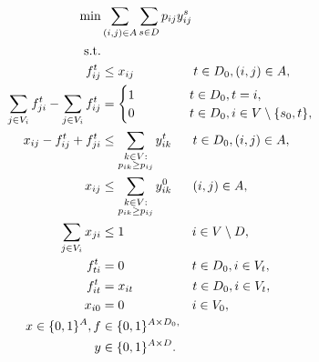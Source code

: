     \begin{subequations}
    \begin{flalign}
  \min &  \sum\limits_{(i,j) \in A} \sum\limits_{s \in D} p_{ij} y^s_{ij}    \\  \notag  
		   \text{s.t.}&                  && \\	\ 
\label{con:pf1:xfrel}  f^{t}_{ij}   &\leq x_{ij}    ~~ \qquad \qquad t\in D_0, (i,j)\in A, \\
 \label{con:pf1:flow}  \sum\limits_{\substack{ j \in V_i }}f^{t}_{ji}-\sum\limits_{\substack{j\in V_i}}f^{t}_{ij}    & = \begin{cases}
    1~~~~&  t\in D_0, t = i, \\        0~~~~ \qquad             & t\in D_0, i\in V\setminus \{s_0, t\},\end{cases}     \\	
\label{con:pf1:yvar} x_{ij} -f^t_{ij}+f^t_{ji}  &\leq \sum\limits_{\substack{k\in V: \\ p_{ik}\geq p_{ij}}}y^t_{ik}   ~~\quad  t\in D_0, (i,j)\in A, \\  		
\label{con:pf1:yvar0} x_{ij} &\leq \sum\limits_{\substack{k\in V: \\ p_{ik}\geq p_{ij}}}y^0_{ik}   ~~\quad  (i,j)\in A, \\  		
\label{con:pf1:B}  \sum_{j\in V_i}x_{ji}&\leq 1~~~~ \qquad  \qquad i\in V\setminus D,\\
\label{con:pf1:noflowFromT} f_{ti}^t&=0 ~~~~ \qquad  \qquad t\in D_0, i\in V_t,   \\
\label{con:pf1:fitt=xit} f_{it}^t&=x_{it} ~~ \qquad  \qquad t\in D_0, i\in V_t, \\
\label{con:pf1:xi0=0} x_{i0}&=0 ~~~~ \qquad  \qquad i\in V_0, \\
\label{con:pf1:dim}	x \in \{0,1\}^{A},f&\in\{0,1\}^{A \times D_0,} \\ 
\label{con:pf1:dimy} y&\in \{0,1\}^{A\times D}.
    \end{flalign}~
    \end{subequations}
    
